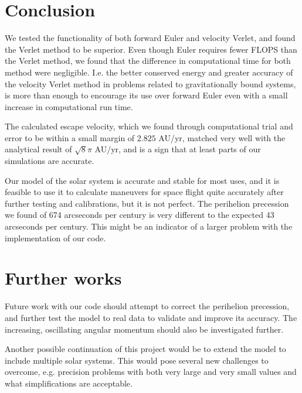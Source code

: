 \documentclass[a4paper, 10pt, reqno]{amsart}
\begin{document}
\section{Conclusion}
We tested the functionality of both forward Euler and velocity Verlet, and found the Verlet method to be superior. Even though Euler requires fewer FLOPS than the Verlet method, we found that the difference in computational time for both method were negligible. I.e. the better conserved energy and greater accuracy of the velocity Verlet method in problems related to gravitationally bound systems, is more than enough to encourage its use over forward Euler even with a small increase in computational run time.

The calculated escape velocity, which we found through computational trial and error to be within a small margin of $2.825$ AU/yr, matched very well with the analytical result of $\sqrt{8}\pi$ AU/yr, and is a sign that at least parts of our simulations are accurate.

Our model of the solar system is accurate and stable for most uses, and it is feasible to use it to calculate maneuvers for space flight quite accurately after further testing and calibrations, but it is not perfect. The perihelion precession we found of 674 arcseconds per century is very different to the expected 43 arcseconds per century. This might be an indicator of a larger problem with the implementation of our code.

\section*{Further works}
Future work with our code should attempt to correct the perihelion precession, and further test the model to real data to validate and improve its accuracy. The increasing, oscillating angular momentum should also be investigated further.

Another possible continuation of this project would be to extend the model to include multiple solar systems. This would pose several new challenges to overcome, e.g. precision problems with both very large and very small values and what simplifications are acceptable.

\nocite{*}
{}

\end{document}
